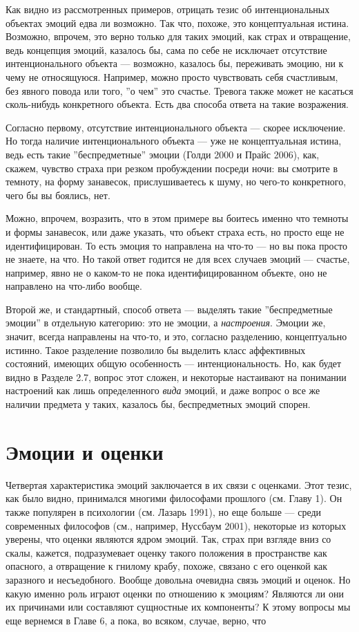 \documentclass[11pt]{book}
\begin{document}
Как видно из рассмотренных примеров, отрицать тезис об интенциональных объектах эмоций едва ли возможно. Так что, похоже, это концептуальная истина. Возможно, впрочем, это верно только для таких эмоций, как страх и отвращение, ведь концепция эмоций, казалось бы, сама по себе не исключает отсутствие интенционального объекта --- возможно, казалось бы, переживать эмоцию, ни к чему не относящуюся. Например, можно просто чувствовать себя счастливым, без явного повода или того, ''о чем'' это счастье. Тревога также может не касаться сколь-нибудь конкретного объекта. Есть два способа ответа на такие возражения.

Согласно первому, отсутствие интенционального объекта --- скорее исключение. Но тогда наличие интенционального объекта --- уже не концептуальная истина, ведь есть такие ''беспредметные'' эмоции (Голди 2000 и Прайс 2006), как, скажем, чувство страха при резком пробуждении посреди ночи: вы смотрите в темноту, на форму занавесок, прислушиваетесь к шуму, но чего-то конкретного, чего бы вы боялись, нет.

Можно, впрочем, возразить, что в этом примере вы боитесь именно что темноты и формы занавесок, или даже указать, что объект страха есть, но просто еще не идентифицирован. То есть эмоция то направлена на что-то --- но вы пока просто не знаете, на что. Но такой ответ годится не для всех случаев эмоций --- счастье, например, явно не о каком-то не пока идентифицированном объекте, оно не направлено на что-либо вообще.

Второй же, и стандартный, способ ответа --- выделять такие ''беспредметные эмоции'' в отдельную категорию: это не эмоции, а \textit{настроения}. Эмоции же, значит, всегда направлены на что-то, и это, согласно разделению, концептуально истинно. Такое разделение позволило бы выделить класс аффективных состояний, имеющих общую особенность --- интенциональность. Но, как будет видно в Разделе 2.7, вопрос этот сложен, и некоторые настаивают на понимании настроений как лишь определенного \textit{вида} эмоций, и даже вопрос о все же наличии предмета у таких, казалось бы, беспредметных эмоций спорен.

\section{Эмоции и оценки}

Четвертая характеристика эмоций заключается в их связи с оценками. Этот тезис, как было видно, принимался многими философами прошлого (см. Главу 1). Он также популярен в психологии (см. Лазарь 1991), но еще больше --- среди современных философов (см., например, Нуссбаум 2001), некоторые из которых уверены, что оценки являются ядром эмоций. Так, страх при взгляде вниз со скалы, кажется, подразумевает оценку такого положения в пространстве как опасного, а отвращение к гнилому крабу, похоже, связано с его оценкой как заразного и несъедобного. Вообще довольна очевидна связь эмоций и оценок. Но какую именно роль играют оценки по отношению к эмоциям? Являются ли они их причинами или составляют сущностные их компоненты? К этому вопросы мы еще вернемся в Главе 6, а пока, во всяком, случае, верно, что
\end{document}
